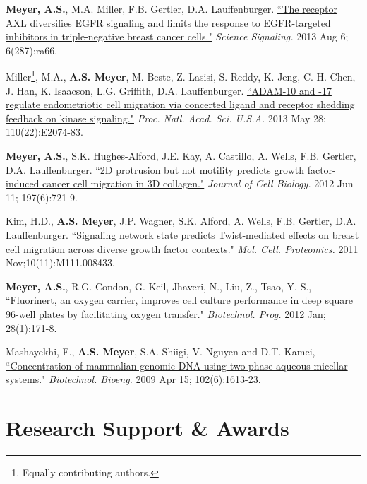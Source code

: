 \documentclass[11pt]{res}
\begin{document}
\begin{resume}
{{\bf Meyer, A.S.}, M.A. Miller, F.B. Gertler, D.A. Lauffenburger. \href{http://www.ncbi.nlm.nih.gov/pubmed/23921085}{``The receptor AXL diversifies EGFR signaling and limits the response to EGFR-targeted inhibitors in triple-negative breast cancer cells."} {\sl Science Signaling.} 2013 Aug 6; 6(287):ra66.

Miller\footnote{Equally contributing authors.}, M.A., {\bf A.S. Meyer}\footnotemark[\value{footnote}], M. Beste, Z. Lasisi, S. Reddy, K. Jeng, C.-H. Chen, J. Han, K. Isaacson, L.G. Griffith, D.A. Lauffenburger. \href{http://www.ncbi.nlm.nih.gov/pubmed/23674691}{``ADAM-10 and -17 regulate endometriotic cell migration via concerted ligand and receptor shedding feedback on kinase signaling."} {\sl Proc. Natl. Acad. Sci. U.S.A.} 2013 May 28; 110(22):E2074-83.

{\bf Meyer, A.S.}, S.K. Hughes-Alford, J.E. Kay, A. Castillo, A. Wells, F.B. Gertler, D.A. Lauffenburger. \href{http://www.ncbi.nlm.nih.gov/pubmed/22665521}{``2D protrusion but not motility predicts growth factor-induced cancer cell migration in 3D collagen."} {\sl Journal of Cell Biology.} 2012 Jun 11; 197(6):721-9.

Kim, H.D., {\bf A.S. Meyer}, J.P. Wagner, S.K. Alford, A. Wells, F.B. Gertler, D.A. Lauffenburger. \href{http://www.ncbi.nlm.nih.gov/pubmed/21832255}{``Signaling network state predicts Twist-mediated effects on breast cell migration across diverse growth factor contexts."} {\sl Mol. Cell. Proteomics.} 2011 Nov;10(11):M111.008433.

{\bf Meyer, A.S.}, R.G. Condon, G. Keil, Jhaveri, N., Liu, Z., Tsao, Y.-S., \href{http://www.ncbi.nlm.nih.gov/pubmed/21954223}{``Fluorinert, an oxygen carrier, improves cell culture performance in deep square 96-well plates by facilitating oxygen transfer."} {\sl Biotechnol. Prog.} 2012 Jan; 28(1):171-8.

Mashayekhi, F., {\bf A.S. Meyer}, S.A. Shiigi, V. Nguyen and D.T. Kamei, \href{http://www.ncbi.nlm.nih.gov/pubmed/19061237}{``Concentration of mammalian genomic DNA using two-phase aqueous micellar systems."} {\sl Biotechnol. Bioeng.} 2009 Apr 15; 102(6):1613-23.

}


\clearpage
\section{Research Support \& Awards}


\end{resume}
\end{document}
